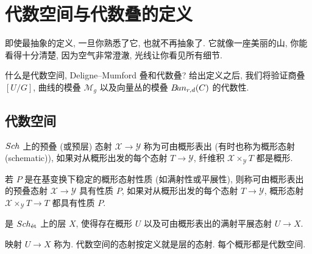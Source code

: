 \section{代数空间与代数叠的定义}\label{src:4.1}
\begin{epigraph}
即使最抽象的定义, 一旦你熟悉了它, 也就不再抽象了. 它就像一座美丽的山, 你能看得十分清楚, 因为空气非常澄澈, 光线让你看见所有细节.
\end{epigraph}
什么是代数空间, Deligne--Mumford 叠和代数叠? 给出定义之后, 我们将验证商叠 $[U/G]$, 曲线的模叠 $\mathcal M_g$ 以及向量丛的模叠 $B\!un_{r,d}(C)$ 的代数性.

\subsection{代数空间}\label{src:4.1.1-subsection}
\begin{definition}[可由概形表出的态射]\label{src:4.1.1}
$Sch$ 上的预叠 (或预层) 态射 $\mathcal X\to\mathcal Y$ 称为可由概形表出 (有时也称为概形态射 (schematic)), 如果对从概形出发的每个态射 $T\to\mathcal Y$, 纤维积 $\mathcal X\times_{\mathcal Y}T$ 都是概形.

若 $P$ 是在基变换下稳定的概形态射性质 (如满射性或平展性), 则称可由概形表出的预叠态射 $\mathcal X\to\mathcal Y$ 具有性质 $P$, 如果对从概形出发的每个态射 $T\to\mathcal Y$, 概形态射 $\mathcal X\times_{\mathcal Y}T\to T$ 都具有性质 $P$.
\end{definition}
\begin{definition}[代数空间]\label{src:4.1.2}
是 $Sch_{\text{ét}}$ 上的层 $X$, 使得存在概形 $U$ 以及可由概形表出的满射平展态射 $U\to X$.

映射 $U\to X$ 称为. 代数空间的态射按定义就是层的态射. 每个概形都是代数空间.
\end{definition}

